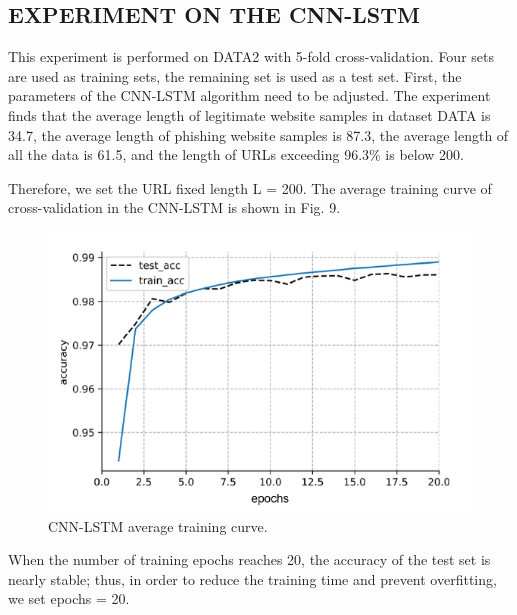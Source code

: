 \documentclass{ieeeaccess}
\begin{document}
\subsection{EXPERIMENT ON THE CNN-LSTM}
This experiment is performed on DATA2 with 5-fold cross-validation. Four sets are used as training sets, the remaining set is used as a test set. First, the parameters of the CNN-LSTM algorithm need to be adjusted. The experiment
finds that the average length of legitimate website samples in dataset DATA is 34.7, the average length of phishing website samples is 87.3, the average length of all the data is 61.5, and the length of URLs exceeding 96.3\% is below 200.
\par Therefore, we set the URL fixed length L = 200. The
average training curve of cross-validation in the CNN-LSTM
is shown in Fig. 9.
\begin{figure}
    \centering
    \includegraphics[width=\linewidth]{figure9.png}
    \caption{CNN-LSTM average training curve.}
    \label{fig:9}
\end{figure}

\par When the number of training epochs reaches 20, the accuracy
of the test set is nearly stable; thus, in order to reduce the
training time and prevent overfitting, we set epochs = 20.
\end{document}

